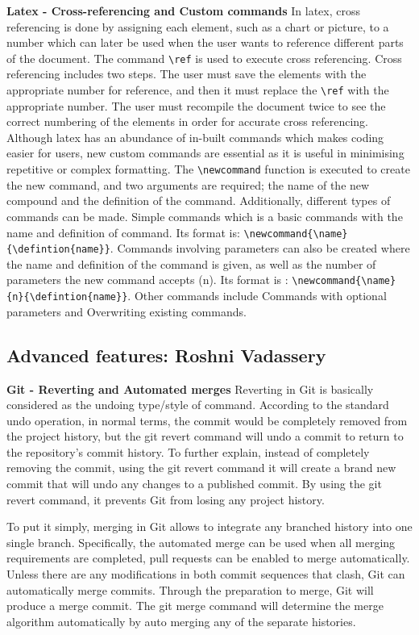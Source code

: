 \documentclass[a4paper, 11pt]{report}
\begin{document}
\textbf{Latex - Cross-referencing and Custom commands}
In latex, cross referencing is done by assigning each element, such as a chart or picture, to a number which can later be used when the user wants to reference different parts of the document. The command \verb|\ref| is used to execute cross referencing. Cross referencing includes two steps. The user must save the elements with the appropriate number for reference, and then it must replace the \verb|\ref| with the appropriate number. The user must recompile the document twice to see the correct numbering of the elements in order for accurate cross referencing.
Although latex has an abundance of in-built commands which makes coding easier for users, new custom commands are essential as it is useful in minimising repetitive or complex formatting. The \verb|\newcommand| function is executed to create the new command, and two arguments are required; the name of the new compound and the definition of the command. Additionally, different types of commands can be made. Simple commands which is a basic commands with the name and definition of command. Its format is: \verb|\newcommand{\name}{\defintion{name}}|. Commands involving parameters can also be created where the name and definition of the command is given, as well as the number of parameters the new command accepts (n). Its format is : \verb|\newcommand{\name}{n}{\defintion{name}}|. Other commands include Commands with optional parameters and Overwriting existing commands.

\subsection{Advanced features: Roshni Vadassery}

\textbf{Git - Reverting and Automated merges}
Reverting in Git is basically considered as the undoing type/style of command. According to the standard undo operation, in normal terms, the commit would be completely removed from the project history, but the git revert command will undo a commit to return to the repository's commit history. To further explain, instead of completely removing the commit, using the git revert command it will create a brand new commit that will undo any changes to a published commit. By using the git revert command, it prevents Git from losing any project history.

To put it simply, merging in Git allows to integrate any branched history into one single branch. Specifically, the automated merge can be used when all merging requirements are completed, pull requests can be enabled to merge automatically. Unless there are any modifications in both commit sequences that clash, Git can automatically merge commits. Through the preparation to merge, Git will produce a merge commit.  The git merge command will determine the merge algorithm automatically by auto merging any of the separate histories.
\end{document}
